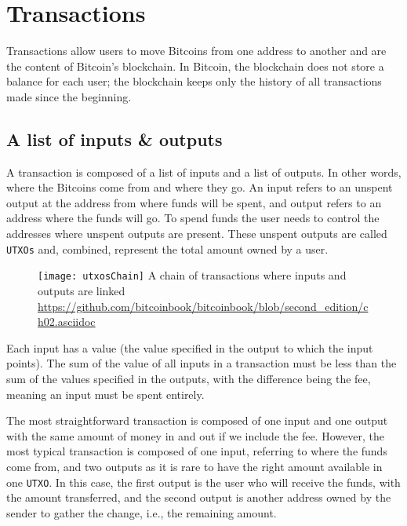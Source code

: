 \section{Transactions}

Transactions allow users to move Bitcoins from one address to another and are the content of  Bitcoin's blockchain. In Bitcoin, the blockchain does
not store a balance for each user; the blockchain keeps only the history of all
transactions made since the beginning.

\subsection{A list of inputs \& outputs}

A transaction is composed of a list of inputs and a list of outputs. In other
words, where the Bitcoins come from and where they go. An input refers to an
unspent output at the address from where funds will be spent, and output
refers to an address where the funds will go.  To spend funds the user needs to control the addresses where unspent outputs are present. These unspent outputs are
called \texttt{UTXOs} and, combined, represent the total amount owned by a user.

\begin{figure}[H]
	\centering
	\texttt{[image: utxosChain]}
  {A chain of transactions where inputs and outputs are linked}
	{\url{https://github.com/bitcoinbook/bitcoinbook/blob/second_edition/ch02.asciidoc}}
	\label{fig:utxosChain}
\end{figure}

Each input has a value (the value specified in the output to which
the input points). The sum of the value of all inputs in a transaction must be less than the
sum of the values specified in the outputs, with the difference being the fee, meaning an input must be spent entirely.

The most straightforward transaction is composed of one input and one output
with the same amount of money in and out if we include the fee. However, the most typical transaction
is composed of one input, referring to where the funds come from, and two
outputs as it is rare to have the right amount available in one
\texttt{UTXO}. In this case, the first output is the user who will receive the funds, with
the amount transferred, and the second output is another address owned by the
sender to gather the change, i.e., the remaining amount.

